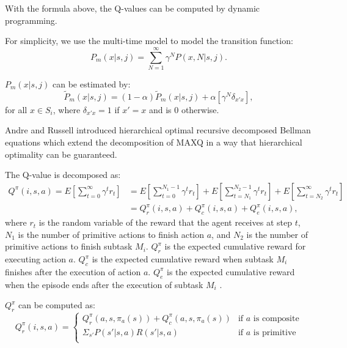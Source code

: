 With the formula above, the Q-values can be computed by dynamic programming.

For simplicity, we use the multi-time model \cite{SMDP} to model the transition function: 
\begin{equation}
    P_m(x|s, j) = \sum^{\infty}_{N=1} \gamma^N P(x, N|s, j).
    \label{eq:multiProb}
\end{equation}

$P_m(x|s, j)$ can be estimated by:
\begin{equation}
    \tilde{P}_m(x|s, j) = (1-\alpha)\tilde{P}_m(x|s, j) + \alpha [ \gamma^N \delta_{x'x}],
    \label{eq:approxP}
\end{equation}
for all $x \in S_i$, where $\delta_{x'x}=1$ if $x' = x$ and is 0 otherwise.

Andre and Russell \cite{Andre02, HORDQ} introduced hierarchical optimal recursive decomposed Bellman equations
which extend the decomposition of MAXQ in a way that hierarchical optimality
can be guaranteed.

The Q-value is decomposed as:
\begin{align}
    \label{eq:HordQ}
    Q^{\pi}(i, s, a) = E[\sum_{t=0}^{\infty}\gamma^t r_t] &= E[\sum_{t=0}^{N_1 - 1}\gamma^t r_t] + E[\sum_{t=N_1}^{N_2 - 1}\gamma^t r_t] + E[\sum_{t=N_2}^{\infty}\gamma^t r_t]\\
                    &= Q_r^{\pi}(i, s, a) + Q_c^{\pi}(i, s, a) + Q_e^{\pi}(i, s, a),
\end{align}
where $r_t$ is the random variable of the reward that the agent receives at step $t$, $N_1$ is the number of primitive actions to finish action $a$, 
and $N_2$ is the number of primitive actions 
to finish subtask $M_i$. $ Q_r^{\pi}$ is the expected cumulative reward for executing action $a$.
$Q_c^{\pi}$ is the expected cumulative reward when subtask $M_i$ finishes after the execution of action $a$. 
$Q_e^{\pi}$ is the expected cumulative reward when the episode ends after the execution of subtask $M_i$ .



$Q_r^{\pi}$ can be computed as:
\begin{equation}
    Q_r^{\pi}(i, s, a) = 
    \left\{\begin{array}{ll}
        Q_r^{\pi}(a, s, \pi_a(s)) + Q_c^{\pi}(a, s, \pi_a(s))& \mbox{if $a$ is composite} \\
        \Sigma_{s'} P(s'|s, a)R(s'|s, a) & \mbox{if $a$ is primitive} \\  
    \end{array} \right.
    \label{eq:Qr}
\end{equation}

